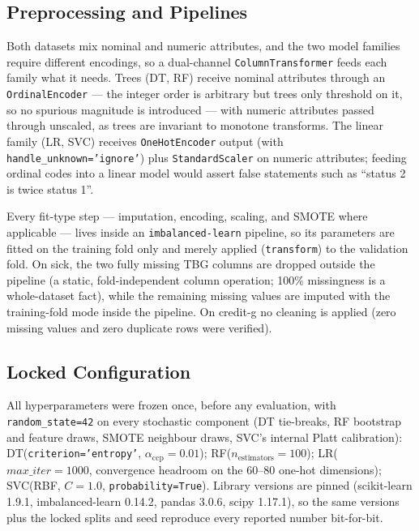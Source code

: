 \documentclass[a4paper,12pt]{article}
\begin{document}
\subsection{Preprocessing and Pipelines}
Both datasets mix nominal and numeric attributes, and the two model
families require different encodings, so a dual-channel
\texttt{ColumnTransformer} feeds each family what it needs. Trees
(DT, RF) receive nominal attributes through an \texttt{OrdinalEncoder}
--- the integer order is arbitrary but trees only threshold on it, so
no spurious magnitude is introduced --- with numeric attributes passed
through unscaled, as trees are invariant to monotone transforms. The
linear family (LR, SVC) receives \texttt{OneHotEncoder} output (with
\texttt{handle\_unknown='ignore'}) plus \texttt{StandardScaler} on
numeric attributes; feeding ordinal codes into a linear model would
assert false statements such as ``status 2 is twice status 1''.

Every fit-type step --- imputation, encoding, scaling, and SMOTE where
applicable --- lives inside an \texttt{imbalanced-learn} pipeline, so
its parameters are fitted on the training fold only and merely applied
(\texttt{transform}) to the validation fold. On sick, the two fully
missing TBG columns are dropped outside the pipeline (a static,
fold-independent column operation; 100\% missingness is a whole-dataset
fact), while the remaining missing values are imputed with the
training-fold mode inside the pipeline. On credit-g no cleaning is
applied (zero missing values and zero duplicate rows were verified).

\subsection{Locked Configuration}
All hyperparameters were frozen once, before any evaluation, with
\texttt{random\_state=42} on every stochastic component (DT tie-breaks,
RF bootstrap and feature draws, SMOTE neighbour draws, SVC's internal
Platt calibration): DT(\texttt{criterion='entropy'},
$\alpha_{\text{ccp}}=0.01$); RF($n_{\text{estimators}}=100$);
LR($\textit{max\_iter}=1000$, convergence headroom on the 60--80
one-hot dimensions); SVC(RBF, $C=1.0$, \texttt{probability=True}).
Library versions are pinned (scikit-learn 1.9.1, imbalanced-learn
0.14.2, pandas 3.0.6, scipy 1.17.1), so the same versions plus the
locked splits and seed reproduce every reported number bit-for-bit.
\end{document}
